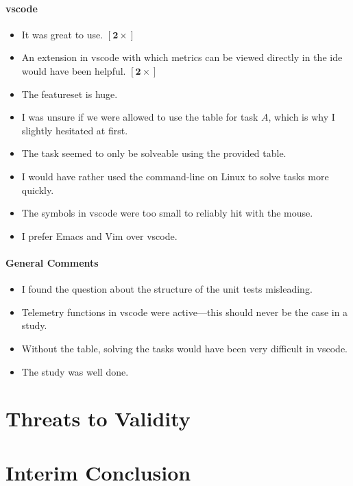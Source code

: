 \documentclass[../thesis]{subfiles}
\begin{document}
\paragraph{\gls{vscode}}
\begin{itemize}
	\item It was great to use. $\bm{[2\times]}$
	\item An extension in \gls{vscode} with which metrics can be viewed directly in the \gls{ide} would have been helpful. $\bm{[2\times]}$
	\item The featureset is huge.
	\item I was unsure if we were allowed to use the table for task $A$, which is why I slightly hesitated at first.
	\item The task seemed to only be solveable using the provided table.
	\item I would have rather used the command-line on Linux to solve tasks more quickly.
	\item The symbols in \gls{vscode} were too small to reliably hit with the mouse.
	\item I prefer Emacs and Vim over \gls{vscode}. \agree
\end{itemize}

\paragraph{General Comments}
\begin{itemize}
	\item I found the question about the structure of the unit tests misleading.
	\item Telemetry functions in \gls{vscode} were active---this should never be the case in a study.
	\item Without the table, solving the tasks would have been very difficult in \gls{vscode}.
	\item The study was well done.
\end{itemize}

\section{Threats to Validity}\label{sec:threats}
\fxfatal{}

\section{Interim Conclusion}
\fxfatal{}

\end{document}
